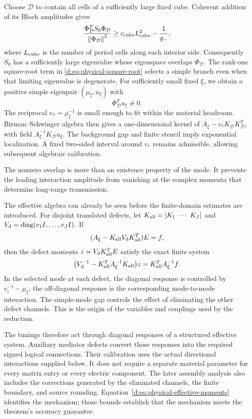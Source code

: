 Choose \(\mathcal D\) to contain all cells of a sufficiently large fixed
cube. Coherent addition of its Bloch amplitudes gives
\begin{equation}
 \frac{\Phi_{\mathcal D}^TS_0\Phi_{\mathcal D}}{\left\lVert \Phi_{\mathcal D}\right\rVert^2}
   \ge c_{\mathrm{cube}}L_{\rm cube}^2-\frac1{g_-},
 \label{d:eq:physical-cube-growth}
\end{equation}
where \(L_{\rm cube}\) is the number of period cells along each interior side.
Consequently \(S_0\) has a sufficiently large eigenvalue whose eigenspace
overlaps \(\Phi_{\mathcal D}\). The rank-one square-root term in
\eqref{d:eq:physical-square-root} selects a simple branch even when that
limiting eigenvalue is degenerate. For sufficiently small fixed \(\xi\),
we obtain a positive simple eigenpair \((\mu_\xi,u_\xi)\) with
\[
 \Phi_{\mathcal D}^Tu_\xi\ne0.
\]
The reciprocal \(v_*=\mu_\xi^{-1}\) is small enough to fit within the
material headroom. Birman--Schwinger algebra then gives a one-dimensional
kernel of
\(A_\xi-v_*K_{\mathcal D}K_{\mathcal D}^T\), with field
\(A_\xi^{-1}K_{\mathcal D}u_\xi\). The background gap and finite
stencil imply exponential localization. A fixed two-sided interval around
\(v_*\) remains admissible, allowing subsequent algebraic calibration.

The nonzero overlap is more than an existence property of the mode. It
prevents the leading interaction amplitude from vanishing at the complex
momenta that determine long-range transmission.

The effective algebra can already be seen before the finite-domain
estimates are introduced. For disjoint translated defects, let
\(K_{\rm all}=[K_1\ \cdots\ K_J]\) and
\(V_{\rm d}=\operatorname{diag}(v_1I,\ldots,v_JI)\).
If
\[
 (A_\xi-K_{\rm all}V_{\rm d}K_{\rm all}^T)E=f,
\]
then the defect moments \(z=V_{\rm d}K_{\rm all}^TE\) satisfy the exact
finite system
\begin{equation}
 \bigl(V_{\rm d}^{-1}
       -K_{\rm all}^TA_\xi^{-1}K_{\rm all}\bigr)z
   =K_{\rm all}^TA_\xi^{-1}f.
 \label{d:eq:physical-effective-moments}
\end{equation}
In the selected mode at each defect, the diagonal response is controlled
by \(v_i^{-1}-\mu_\xi\); the off-diagonal response is the corresponding
mode-to-mode interaction. The simple-mode gap controls the effect of
eliminating the other defect channels. This is the origin of the
variables and couplings used by the reduction.

The tunings therefore act through diagonal responses of a structured
effective system. Auxiliary mediator defects convert those responses
into the required signed logical connections. Their calibration uses the
actual directional interactions supplied below. It does not require a
separate material parameter for every matrix entry or every electric
component. The later assembly analysis also includes the corrections
generated by the eliminated channels, the finite boundary, and source
rounding. Equation~\eqref{d:eq:physical-effective-moments} identifies the
mechanism; those bounds establish that the mechanism meets the theorem's
accuracy guarantee.

